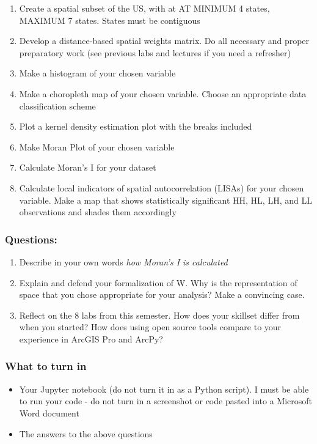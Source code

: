 \documentclass[]{article}
\begin{document}
\begin{enumerate}
\def\labelenumi{\arabic{enumi}.}
\setcounter{enumi}{1}
\item
  Create a spatial subset of the US, with at AT MINIMUM 4 states,
  MAXIMUM 7 states. States must be contiguous
\item
  Develop a distance-based spatial weights matrix. Do all necessary and
  proper preparatory work (see previous labs and lectures if you need a
  refresher)
\item
  Make a histogram of your chosen variable
\item
  Make a choropleth map of your chosen variable. Choose an appropriate
  data classification scheme
\item
  Plot a kernel density estimation plot with the breaks included
\item
  Make Moran Plot of your chosen variable
\item
  Calculate Moran's I for your dataset
\item
  Calculate local indicators of spatial autocorrelation (LISAs) for your
  chosen variable. Make a map that shows statistically significant HH,
  HL, LH, and LL observations and shades them accordingly
\end{enumerate}

\hypertarget{questions}{%
\subsubsection{Questions:}\label{questions}}

\begin{enumerate}
\def\labelenumi{\arabic{enumi}.}
\item
  Describe in your own words \emph{how Moran's I is calculated}
\item
  Explain and defend your formalization of W. Why is the representation
  of space that you chose appropriate for your analysis? Make a
  convincing case.
\item
  Reflect on the 8 labs from this semester. How does your skillset
  differ from when you started? How does using open source tools compare
  to your experience in ArcGIS Pro and ArcPy?
\end{enumerate}

\hypertarget{what-to-turn-in}{%
\subsubsection{What to turn in}\label{what-to-turn-in}}

\begin{itemize}
\item
  Your Jupyter notebook (do not turn it in as a Python script). I must
  be able to run your code - do not turn in a screenshot or code pasted
  into a Microsoft Word document
\item
  The answers to the above questions
\end{itemize}
\end{document}
